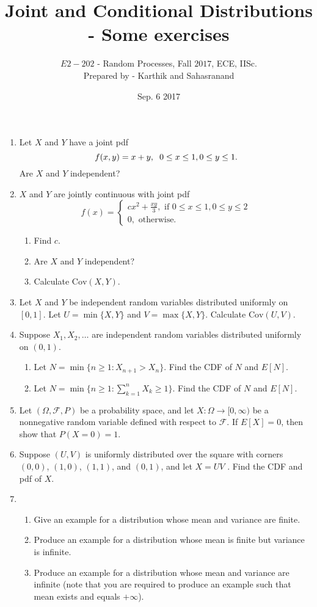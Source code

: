 \documentclass[11pt]{article}
\title {\sc Joint and Conditional Distributions - Some exercises}
\author{$E2-202$ - Random Processes, Fall $2017$, ECE, IISc.\\Prepared by - Karthik and Sahasranand}
\date{Sep. 6 2017}
\begin{document}
\maketitle 

\begin{enumerate}
\item Let $X$ and $Y$ have a joint pdf
\[
f(x,y) = x+y, \hspace{0.2cm} 0 \le x \le 1, 0 \le y \le 1. 
\] 
Are $X$ and $Y$ independent?

\item $X$ and $Y$ are jointly continuous with joint pdf
\[
f(x)=
\begin{cases}
cx^2 + \frac{xy}{3}, \text{ if } 0 \le x \le 1, 0 \le y \le 2\\
0, \text{ otherwise.}
\end{cases}
\]
\begin{enumerate}
\item Find $c$.
\item Are $X$ and $Y$ independent?
\item Calculate $\text{Cov}(X,Y)$.
\end{enumerate}

\item Let $X$ and $Y$ be independent random variables distributed uniformly on $[0,1]$. Let $U = \min\{X,Y\}$ and $V = \max\{X,Y\}$. Calculate $\text{Cov}(U,V)$.
\item Suppose $X_{1},X_{2},\ldots$ are independent random variables distributed uniformly on $(0,1)$.
\begin{enumerate}
	\item Let $N=\min\{n\geq 1:X_{n+1}>X_{n}\}$. Find the CDF of $N$ and $E[N]$.
	\item Let $N=\min\{n\geq 1:\sum\limits_{k=1}^{n}X_{k}\geq 1\}$. Find the CDF of $N$ and $E[N]$.
\end{enumerate}
\item Let $(\Omega,\mathcal{F},P)$ be a probability space, and let $X:\Omega\to [0,\infty)$ be a nonnegative random variable defined with respect to $\mathcal{F}$. If $E[X]=0$, then show that $P(X=0)=1$.
\item Suppose $(U,V )$ is uniformly distributed over the square with corners $ (0,0) $, $ (1,0) $, $ (1,1) $, and $ (0,1) $, and
let $ X = UV $ . Find the CDF and pdf of $ X $.
\item 
\begin{enumerate}
    \item Give an example for a distribution whose mean and variance are finite.
	\item Produce an example for a distribution whose mean is finite but variance is infinite.
	\item Produce an example for a distribution whose mean and variance are infinite (note that you are required to produce an example such that mean exists and equals $+\infty$). 
\end{enumerate}
\end{enumerate}
\end{document}
